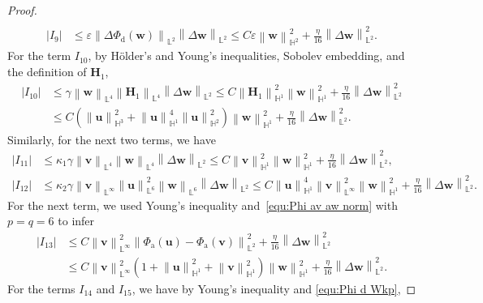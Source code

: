 \documentclass[11pt, reqno]{amsart}
\theoremstyle{definition}
\numberwithin{equation}{section}
\newcommand{\bff}{\boldsymbol}
\newcommand{\bb}{\mathbb}
\newcommand{\norm}[2]{\left\|{#1}\right\|_{#2}}
\newcommand{\abs}[1]{\left|{#1}\right|}
\begin{document}
\begin{proof}
\begin{align*}
    \\
    \abs{I_9}
    &\leq
    \varepsilon \norm{\Delta \Phi_{\mathrm{d}}(\bff{w})}{\bb{L}^2} \norm{\Delta \bff{w}}{\bb{L}^2}
    \leq
    C \varepsilon \norm{\bff{w}}{\bb{H}^2}^2
    +
    \frac{\eta}{16} \norm{\Delta \bff{w}}{\bb{L}^2}^2.
\end{align*}
For the term $I_{10}$, by H\"older's and Young's inequalities, Sobolev embedding, and the definition of $\bff{H}_1$,
\begin{align*}
    \abs{I_{10}}
    &\leq
    \gamma \norm{\bff{w}}{\bb{L}^4} \norm{\bff{H}_1}{\bb{L}^4} \norm{\Delta \bff{w}}{\bb{L}^2}
    \leq
    C \norm{\bff{H}_1}{\bb{H}^1}^2 \norm{\bff{w}}{\bb{H}^1}^2
    +
    \frac{\eta}{16} \norm{\Delta \bff{w}}{\bb{L}^2}^2
    \\
    &\leq
    C \left(\norm{\bff{u}}{\bb{H}^3}^2 + \norm{\bff{u}}{\bb{H}^1}^4 \norm{\bff{u}}{\bb{H}^2}^2\right) \norm{\bff{w}}{\bb{H}^1}^2
    +
    \frac{\eta}{16} \norm{\Delta \bff{w}}{\bb{L}^2}^2.
\end{align*}
Similarly, for the next two terms, we have
\begin{align*}
    \abs{I_{11}}
    &\leq
    \kappa_1 \gamma \norm{\bff{v}}{\bb{L}^4} \norm{\bff{w}}{\bb{L}^4} \norm{\Delta \bff{w}}{\bb{L}^2}
    \leq
    C \norm{\bff{v}}{\bb{H}^1}^2 \norm{\bff{w}}{\bb{H}^1}^2
    +
    \frac{\eta}{16} \norm{\Delta \bff{w}}{\bb{L}^2}^2,
    \\
    \abs{I_{12}}
    &\leq
    \kappa_2 \gamma \norm{\bff{v}}{\bb{L}^\infty} 
    \norm{\bff{u}}{\bb{L}^6}^2
    \norm{\bff{w}}{\bb{L}^6} \norm{\Delta \bff{w}}{\bb{L}^2}
    \leq
    C \norm{\bff{u}}{\bb{H}^1}^4 \norm{\bff{v}}{\bb{L}^\infty}^2 \norm{\bff{w}}{\bb{H}^1}^2
    +
    \frac{\eta}{16} \norm{\Delta \bff{w}}{\bb{L}^2}^2.
\end{align*}
For the next term, we used Young's inequality and~\eqref{equ:Phi av aw norm} with $p=q=6$ to infer
\begin{align*}
    \abs{I_{13}}
    &\leq
    C \norm{\bff{v}}{\bb{L}^\infty}^2 \norm{\Phi_{\mathrm{a}}(\bff{u})-\Phi_{\mathrm{a}}(\bff{v})}{\bb{L}^2}^2 
    +
    \frac{\eta}{16} \norm{\Delta \bff{w}}{\bb{L}^2}^2
    \\
    &\leq
    C \norm{\bff{v}}{\bb{L}^\infty}^2 \left(1+\norm{\bff{u}}{\bb{H}^1}^2 + \norm{\bff{v}}{\bb{H}^1}^2 \right) \norm{\bff{w}}{\bb{H}^1}^2
    +
    \frac{\eta}{16} \norm{\Delta \bff{w}}{\bb{L}^2}^2.
\end{align*}
For the terms $I_{14}$ and $I_{15}$, we have by Young's inequality and \eqref{equ:Phi d Wkp},

\end{proof}
\end{document}
